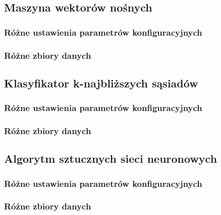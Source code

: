 \documentclass[a4paper,11pt]{article}
\begin{document}
\subsection{Maszyna wektorów nośnych}
\subsubsection{Różne ustawienia parametrów konfiguracyjnych}
\subsubsection{Różne zbiory danych}

\subsection{Klasyfikator k-najbliższych sąsiadów}
\subsubsection{Różne ustawienia parametrów konfiguracyjnych}
\subsubsection{Różne zbiory danych}

\subsection{Algorytm sztucznych sieci neuronowych}
\subsubsection{Różne ustawienia parametrów konfiguracyjnych}
\subsubsection{Różne zbiory danych}
\end{document}
